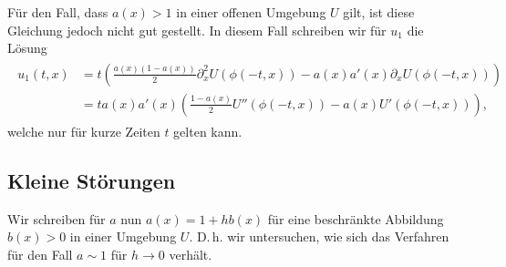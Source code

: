 Für den Fall, dass $a(x) > 1$ in einer offenen Umgebung $U$ gilt, ist diese Gleichung jedoch nicht gut gestellt.
In diesem Fall schreiben wir für $u_1$ die Lösung
\begin{align}
\begin{split}
u_1(t,x) &= t \left( \frac{a(x)(1 - a(x) )}{2} \partial^2_x U( \phi(-t, x) ) - a(x) a'(x)  \partial_x U( \phi(-t, x) )\right)\\
&= t a(x) a'(x) \left( \frac{1 - a(x) }{2} U''( \phi(-t, x) ) - a(x)  U'( \phi(-t, x) )\right),
\end{split}
\end{align}
welche nur für kurze Zeiten $t$ gelten kann.

\subsection*{Kleine Störungen}

Wir schreiben für $a$ nun $a(x) = 1 + h b(x)$ für eine beschränkte Abbildung $b(x) > 0$ in einer Umgebung $U$.
D.\,h. wir untersuchen, wie sich das Verfahren für den Fall $a  \sim 1$ für $h \to 0$ verhält.

